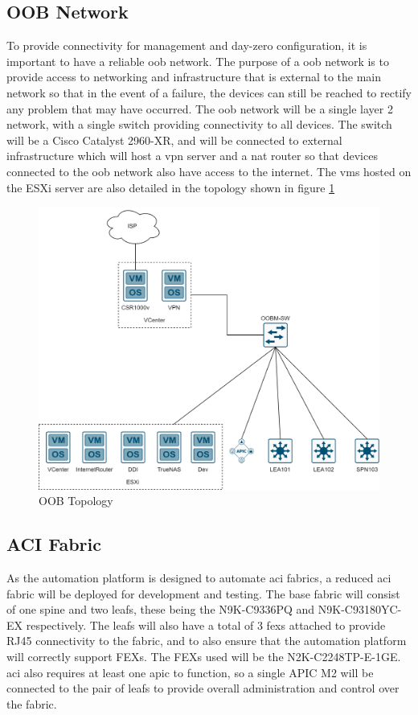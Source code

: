 \subsection{OOB Network}
\label{design:Testbed:network-design:oob}
To provide connectivity for management and day-zero configuration, it is important to have a reliable \gls{oob} network. The purpose of a \gls{oob} network is to provide access to networking and infrastructure that is external to the main network so that in the event of a failure, the devices can still be reached to rectify any problem that may have occurred. The \gls{oob} network will be a single layer 2 network, with a single switch providing connectivity to all devices. The switch will be a Cisco Catalyst 2960-XR, and will be connected to external infrastructure which will host a \gls{vpn} server and a \gls{nat} router so that devices connected to the \gls{oob} network also have access to the internet. The \gls{vm}s hosted on the ESXi server are also detailed in the topology shown in figure \ref{fig:oob-topology}

\begin{figure}[H]
    \centering
    \includegraphics[scale=0.25]{images/oob-topology.png}
    \caption{OOB Topology}
    \label{fig:oob-topology}
\end{figure}

\subsection{ACI Fabric}
\label{design:Testbed:network-design}
As the automation platform is designed to automate \gls{aci} fabrics, a reduced \gls{aci} fabric will be deployed for development and testing. The base fabric will consist of one spine and two leafs, these being the N9K-C9336PQ and N9K-C93180YC-EX respectively. The leafs will also have a total of 3 \gls{fex}s attached to provide RJ45 connectivity to the fabric, and to also ensure that the automation platform will correctly support FEXs. The FEXs used will be the N2K-C2248TP-E-1GE. \gls{aci} also requires at least one \gls{apic} to function, so a single APIC M2 will be connected to the pair of leafs to provide overall administration and control over the fabric.


